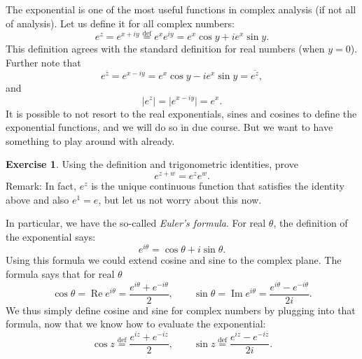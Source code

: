 \documentclass[12pt,openany]{book}
\renewcommand{\Re}{\operatorname{Re}}
\renewcommand{\Im}{\operatorname{Im}}
\newcommand{\sabs}[1]{\lvert {#1} \rvert}
\newcommand{\myindex}[1]{#1\index{#1}}
\theoremstyle{plain}
\theoremstyle{remark}
\theoremstyle{definition}
\newenvironment{exbox}{%
    \def\FrameCommand{\vrule width 1pt \relax\hspace {10pt}}%
    \MakeFramed {\advance \hsize -\width \FrameRestore }%
}{%
    \endMakeFramed
}
\theoremstyle{exercise}
\newtheorem{exercise}{Exercise}[section]
\theoremstyle{example}
\begin{document}
The exponential is one of the most useful functions in complex analysis
(if not all of analysis).  Let us define it for all complex numbers:
\begin{equation*}
e^{z} = 
e^{x+iy}
\overset{\text{def}}{=}
e^x e^{iy}
=
e^x\cos y + i e^x \sin y .
\end{equation*}
This definition agrees with the standard definition for real numbers (when
$y=0$).  Further note that
\begin{equation*}
e^{\bar{z}} = 
e^{x-iy} =
e^x\cos y - i e^x \sin y  = \overline{e^{z}} ,
\end{equation*}
and
\begin{equation*}
\sabs{e^{z}} = 
\sabs{e^{x-iy}} =
e^x .
\end{equation*}
It is possible to not resort to the real exponentials, sines and cosines
to define the exponential functions, and we will do so in due course.
But we want to have something to play around with already.

\begin{exbox}
\begin{exercise}
Using the definition and trigonometric identities, prove
\begin{equation*}
e^{z+w} = e^z e^w .
\end{equation*}
Remark: In fact, $e^z$ is the unique continuous
function that satisfies the identity above
and also $e^1 = e$, but let us not worry about this now.
\end{exercise}
\end{exbox}

In particular, we have the so-called
\emph{\myindex{Euler's formula}}.  For real $\theta$, the definition
of the exponential says:
\begin{equation*}
e^{i\theta}
=
\cos \theta + i \sin \theta .
\end{equation*}
Using this formula we could extend cosine and sine to the complex plane.
The formula says that for real $\theta$
\begin{equation*}
\cos \theta = \Re e^{i\theta} = \frac{e^{i\theta}+e^{-i\theta}}{2} ,
\qquad
\sin \theta = \Im e^{i\theta} = \frac{e^{i\theta}-e^{-i\theta}}{2i} .
\end{equation*}
We thus simply define cosine and sine for complex numbers by plugging
into that formula, now that we know how to evaluate the exponential:
\begin{equation*}
\cos z \overset{\text{def}}{=} \frac{e^{iz}+e^{-iz}}{2} ,
\qquad
\sin z \overset{\text{def}}{=} \frac{e^{iz}-e^{-iz}}{2i} .
\end{equation*}
\end{document}
